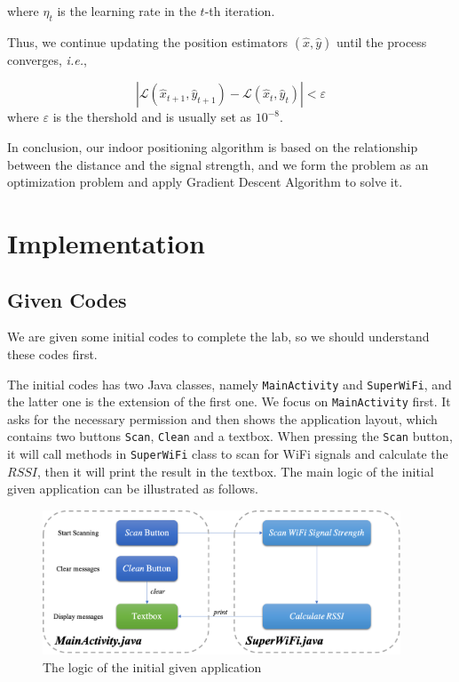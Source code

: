 \documentclass[12pt, a4paper]{article}
\theoremstyle{definition}
\begin{document}
\noindent where $\eta_t$ is the learning rate in the $t$-th iteration.

Thus, we continue updating the position estimators $(\hat{x}, \hat{y})$ until the process converges, \textit{i.e.},

$$
\left|\mathcal{L}(\hat{x}_{t+1}, \hat{y}_{t+1}) - \mathcal{L}(\hat{x}_t, \hat{y}_t)\right| < \varepsilon
$$
\noindent where $\varepsilon$ is the thershold and is usually set as $10^{-8}$.

In conclusion, our indoor positioning algorithm is based on the relationship between the distance and the signal strength, and we form the problem as an optimization problem and apply Gradient Descent Algorithm to solve it.

\section{Implementation}\label{section3}
\subsection{Given Codes}\label{section3.1}
We are given some initial codes to complete the lab, so we should understand these codes first.

The initial codes has two Java classes, namely \texttt{MainActivity} and \texttt{SuperWiFi}, and the latter one is the extension of the first one. We focus on \texttt{MainActivity} first. It asks for the necessary permission and then shows the application layout, which contains two buttons \texttt{Scan}, \texttt{Clean} and a textbox. When pressing the \texttt{Scan} button, it will call methods in \texttt{SuperWiFi} class to scan for WiFi signals and calculate the $RSSI$, then it will print the result in the textbox. The main logic of the initial given application can be illustrated as follows.
\begin{figure}[htbp]
	\centering
	\includegraphics[width=4.2in]{1.png}
	\caption{The logic of the initial given application}
	\label{fig1}
\end{figure}
\end{document}
